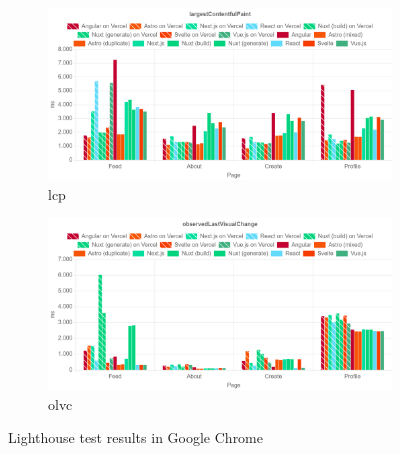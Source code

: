 \documentclass[a4paper, 12pt]{article}
\begin{document}
\begin{figure}[ht!]\ContinuedFloat
  \centering
  \begin{subfigure}{0.8\linewidth}
    \begin{center}
      \includegraphics[width=\linewidth, keepaspectratio]{img/lighthouse-results/LCP.png}
    \end{center}
    \caption{\acrfull{lcp}}\label{subfig:LH:largestContentfulPaint}
  \end{subfigure}
  \begin{subfigure}{0.8\linewidth}
    \begin{center}
      \includegraphics[width=\linewidth, keepaspectratio]{img/lighthouse-results/OLVC.png}
    \end{center}
    \caption{\acrfull{olvc}}\label{subfig:LH:observedLastVisualChange}
  \end{subfigure}
  \caption{Lighthouse test results in Google Chrome}\label{fig:lighthouseResults}
\end{figure}
\end{document}
